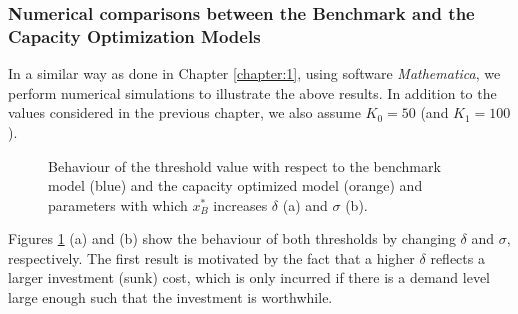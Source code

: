 \subsubsection{Numerical comparisons between the Benchmark and the Capacity Optimization Models}

In a similar way as done in Chapter \ref{chapter:1}, using software \textit{Mathematica}, we perform numerical simulations to illustrate the above results. 
In addition to the values considered in the previous chapter, we also assume $K_0=50$ (and $K_1=100$).



\begin{figure}[!htb]
	\begin{subfigmatrix}{2}
	\end{subfigmatrix}
	\caption{Behaviour of the threshold value with respect to the benchmark model (blue) and the capacity optimized model (orange) and parameters with which $x^*_B$ increases $\delta$ (a) and $\sigma$ (b).}
	\label{fig:2_x2}
\end{figure}


Figures \ref{fig:2_x2} (a) and (b) show the behaviour of both thresholds by changing $\delta$ and $\sigma$, respectively. 
The first result is motivated by the fact that a higher $\delta$ reflects a larger investment (sunk) cost, which is only incurred if there is a demand level large enough such that the investment is worthwhile.

